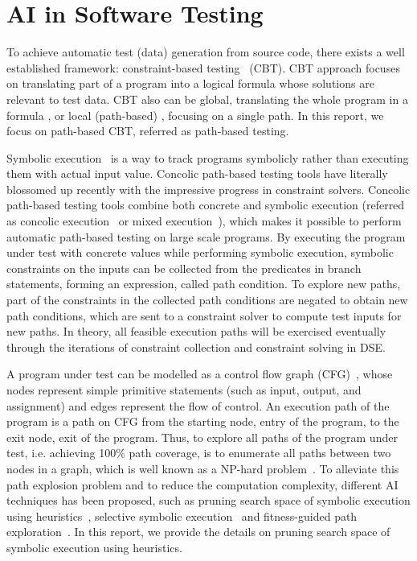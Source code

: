 \section{AI in Software Testing}
To achieve automatic test (data) generation from source code, there exists a well established framework: constraint-based testing~\cite{constraint,inka,dart,cute,onthefly}  (CBT). CBT approach focuses on translating part of a program into a logical formula whose solutions are relevant to test data. CBT also can be global, translating the whole program in a formula \cite{constraint,inka}, or local (path-based) \cite{dart,cute,onthefly}, focusing on a single path. In this report, we focus on path-based CBT, referred as path-based testing. 

Symbolic execution~\cite{symbolic} is a way to track programs symbolicly rather than executing them with actual input value. Concolic path-based testing tools have literally blossomed up recently \cite{extenjpf,structural,mixed,exe,fuzz,pex} with the impressive progress in constraint solvers. Concolic path-based testing tools combine both concrete and symbolic execution (referred as concolic execution~\cite{dart,cute} or mixed execution~\cite{mixed}), which makes it possible to perform automatic path-based testing on large scale programs. By executing the program under test with concrete values while performing symbolic execution, symbolic constraints on the inputs can be collected from the predicates in branch statements, forming an expression, called path condition. To explore new paths, part of the constraints in the collected path conditions are negated to obtain new path conditions, which are sent to a constraint solver to compute test inputs for new paths. In theory, all feasible execution paths will be exercised eventually through the iterations of constraint collection and constraint solving in DSE. 

A program under test can be modelled as a control flow graph (CFG)~\cite{testbook}, whose nodes represent simple primitive statements (such as input, output, and assignment) and edges represent the flow of control. An execution path of the program is a path on CFG from the starting node, entry of the program, to the exit node, exit of the program. Thus, to explore all paths of the program under test, i.e. achieving 100\% path coverage, is to enumerate all paths between two nodes in a graph, which is well known as a NP-hard problem~\cite{graph}. To alleviate this path explosion problem and to reduce the computation complexity, different AI techniques has been proposed, such as pruning search space of symbolic execution using heuristics~\cite{prune}, selective symbolic execution~\cite{selective} and fitness-guided path exploration~\cite{fitness}. In this report, we provide the details on pruning search space of symbolic execution using heuristics.

